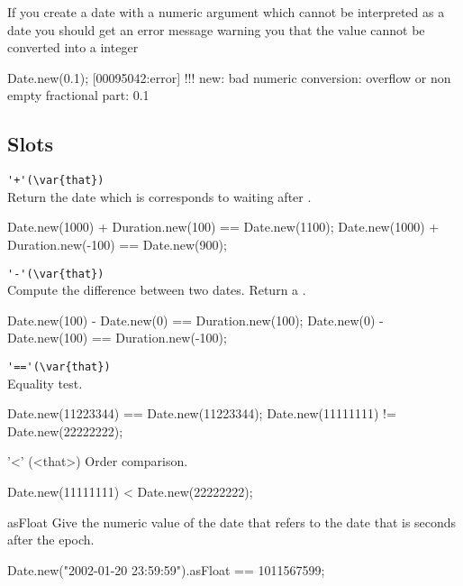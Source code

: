 If you create a date with a numeric argument which cannot be interpreted as
a date you should get an error message warning you that the value cannot be
converted into a integer

\begin{urbiscript}
Date.new(0.1);
[00095042:error] !!! new: bad numeric conversion: overflow or non empty fractional part: 0.1
\end{urbiscript}

\subsection{Slots}

\begin{urbiscriptapi}
\item \lstinline|'+'(\var{that})|\\
  Return the date which is corresponds to waiting 
   after \this.
\begin{urbiassert}
Date.new(1000) + Duration.new(100) == Date.new(1100);
Date.new(1000) + Duration.new(-100) == Date.new(900);
\end{urbiassert}

\item \lstinline|'-'(\var{that})|\\
  Compute the difference between two dates.  Return a
  .
\begin{urbiassert}
Date.new(100) - Date.new(0) == Duration.new(100);
Date.new(0) - Date.new(100) == Duration.new(-100);
\end{urbiassert}

\item \lstinline|'=='(\var{that})|\\
  Equality test.
\begin{urbiassert}
Date.new(11223344) == Date.new(11223344);
Date.new(11111111) != Date.new(22222222);
\end{urbiassert}

\item['<'](<that>)%
  Order comparison.
\begin{urbiassert}
Date.new(11111111) < Date.new(22222222);
\end{urbiassert}

\item[asFloat]
  Give the numeric value of the date that refers to the date that is 
seconds after the epoch.
\begin{urbiassert}
Date.new("2002-01-20 23:59:59").asFloat == 1011567599;
\end{urbiassert}


\end{urbiscriptapi}
